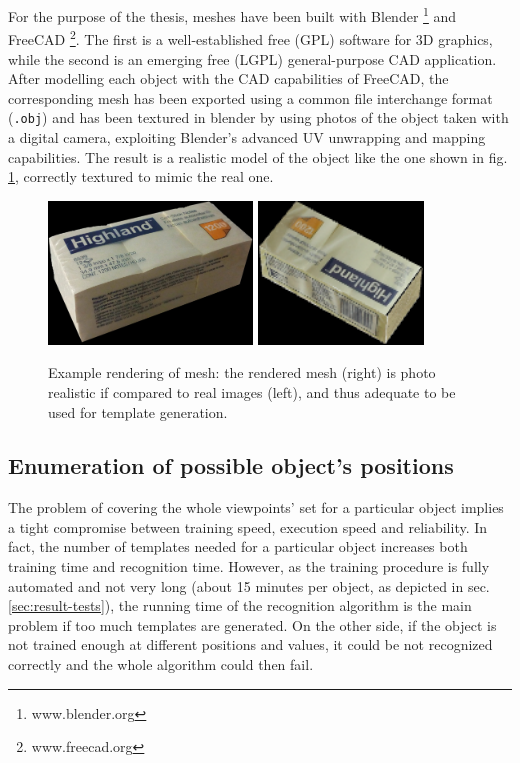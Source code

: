 For the purpose of the thesis, meshes have been built with Blender
\footnote{www.blender.org} and FreeCAD \footnote{www.freecad.org}. The first is a
well-established free (GPL) software for 3D graphics, while the second is an
emerging free (LGPL) general-purpose CAD application. After modelling each
object with the CAD capabilities of FreeCAD, the corresponding mesh has been
exported using a common file interchange format (\texttt{.obj}) and has been
textured in blender by using photos of the object taken with a digital camera,
exploiting Blender's advanced UV unwrapping and mapping capabilities. The result
is a realistic model of the object like the one shown in fig.
\ref{fig:realistic_rendering}, correctly textured to mimic the real one.

\begin{figure}[htbp]
\centering
\includegraphics[height=1.5in]{./Results/postit_photo}
\includegraphics[height=1.5in]{./Results/postit_render}
\caption{Example rendering of mesh: the rendered mesh (right) is photo realistic
  if compared to real images (left),
and thus adequate to be used for template generation. \label{fig:realistic_rendering}}
\end{figure}

\subsection{Enumeration of possible object's positions}
The problem of covering the whole viewpoints' set for a particular object
implies a tight compromise between training speed, execution speed and
reliability. In fact, the number of templates needed for a particular object increases
both training time and recognition time. However, as the training procedure is
fully automated and not very long (about 15 minutes per object, as depicted in sec.
\ref{sec:result-tests}),
the running time of the recognition algorithm is the main problem if too much
templates are generated. On the other side, if the object is not trained enough
at different positions and values, it could be not recognized correctly and the
whole algorithm could then fail.

